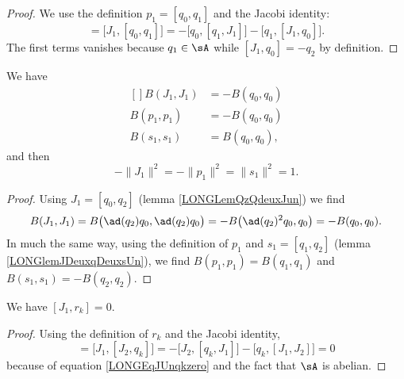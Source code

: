 \begin{proof}
	We use the definition $p_1=[q_0,q_1]$ and the Jacobi identity:
	\begin{equation}
		[J_1,p_1]=\big[ J_1,[q_0,q_1] \big]=-\big[ q_0,[q_1,J_1] \big]-\big[ q_1,[J_1,q_0] \big].
	\end{equation}
	The first terms vanishes because $q_1\in\sA$ while $[J_1,q_0]=-q_2$ by definition.
\end{proof}

\begin{proposition}		\label{LONGPropBJpsun}
	We have
	\begin{equation}
		\begin{aligned}[]
			B(J_1,J_1)&=-B(q_0,q_0)\\
			B(p_1,p_1)&=-B(q_0,q_0)\\
			B(s_1,s_1)&=B(q_0,q_0),
		\end{aligned}
	\end{equation}
	and then 
	\begin{equation}
		-\| J_1 \|^2=-\| p_1 \|^2=\| s_1 \|^2=1.
	\end{equation}
\end{proposition}

\begin{proof}
	Using $J_1=[q_0,q_2]$ (lemma \ref{LONGLemQzQdeuxJun}) we find
	\begin{equation}
		B(J_1,J_1)=B\big( \ad(q_2)q_0,\ad(q_2)q_0 \big)=-B\big( \ad(q_2)^2q_0,q_0 \big)=-B(q_0,q_0).
	\end{equation}
	In much the same way, using the definition of $p_1$ and $s_1=[q_1,q_2]$ (lemma \ref{LONGlemJDeuxqDeuxsUn}), we find $B(p_1,p_1)=B(q_1,q_1)$ and $B(s_1,s_1)=-B(q_2,q_2)$.

\end{proof}

\begin{lemma}		\label{LONGLemJunrkzero}
	We have $[J_1,r_k]=0$.
\end{lemma}

\begin{proof}
	Using the definition of $r_k$ and the Jacobi identity,
	\begin{equation}
		[J_1,r_k]= \big[ J_1,[J_2,q_k] \big]=-\big[ J_2,[q_k,J_1] \big]-\big[ q_k,[J_1,J_2] \big]=0
	\end{equation}
	because of equation \eqref{LONGEqJUnqkzero} and the fact that $\sA$ is abelian.
\end{proof}

